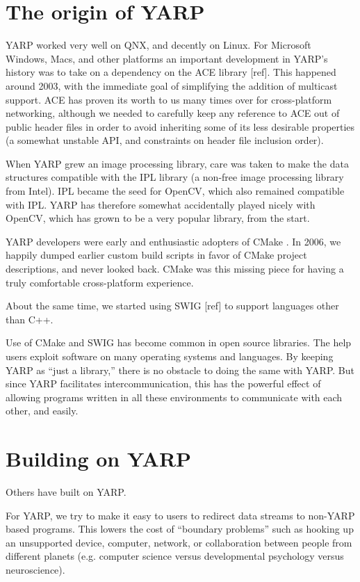 \documentclass[letterpaper]{article}
\begin{document}
\section{The origin of YARP}


YARP worked very well on QNX, and decently on Linux.  For Microsoft
Windows, Macs, and other platforms an important development in YARP's
history was to take on a dependency on the ACE library [ref].  This
happened around 2003, with the immediate goal of simplifying the
addition of multicast support.  ACE has proven its worth to us many
times over for cross-platform networking, although we needed
to carefully keep any reference to ACE out of public header files
in order to avoid inheriting some of its less desirable properties
(a somewhat unstable API, and constraints on header file inclusion
order).

When YARP grew an image processing library, care was taken to make the
data structures compatible with the IPL library (a non-free image
processing library from Intel).  IPL became the seed for OpenCV, which
also remained compatible with IPL. YARP has therefore somewhat
accidentally played nicely with OpenCV, which has grown to be a very
popular library, from the start.

YARP developers were early and enthusiastic adopters of CMake
\cite{fitzpatrick10cmaking}.  In 2006, we happily dumped
earlier custom build scripts in favor of CMake project descriptions,
and never looked back.  CMake was this missing piece for having a
truly comfortable cross-platform experience.

About the same time, we started using SWIG [ref] to support languages
other than C++.

Use of CMake and SWIG has become common in open source libraries.
The help users exploit software on many operating systems and 
languages.  By keeping YARP as ``just a library,'' there is no
obstacle to doing the same with YARP.  But since YARP facilitates
intercommunication, this has the powerful effect of allowing 
programs written in all these environments to communicate with
each other, and easily.



\section{Building on YARP}

Others have built on YARP.


For YARP, we try to make it easy to users to redirect data streams to
non-YARP based programs.  This lowers the cost of ``boundary
problems'' such as hooking up an unsupported device, computer,
network, or collaboration between people from different planets
(e.g. computer science versus developmental psychology versus
neuroscience).
\end{document}
